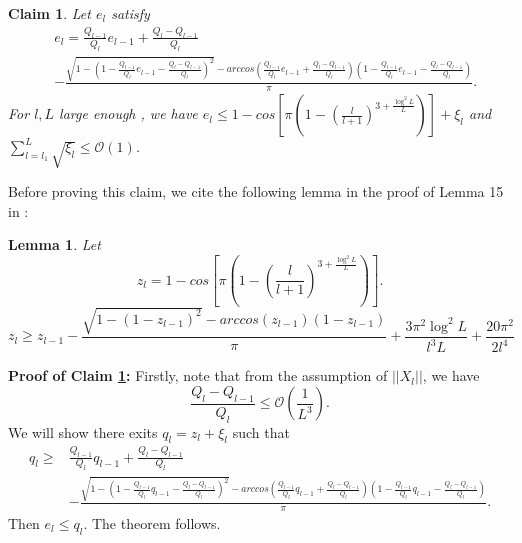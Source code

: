 \documentclass{article}
\newcommand{\cO}{\mathcal{O}}
\newtheorem{lem}[theo]{\textbf{Lemma}}
\newtheorem{cla}{\textbf{Claim}}[section]
\begin{document}
\begin{cla}\label{cl2}
Let $e_l$ satisfy
\begin{equation}
\begin{aligned}
&e_l=\frac{Q_{l-1}}{Q_{l}}e_{l-1}+\frac{Q_{l}-Q_{l-1}}{Q_{l}}\\
 &- \frac{\sqrt{1-(1-\frac{Q_{l-1}}{Q_{l}}e_{l-1}-\frac{Q_{l}-Q_{l-1}}{Q_{l}})^2}-arccos(\frac{Q_{l-1}}{Q_{l}}e_{l-1}+\frac{Q_{l}-Q_{l-1}}{Q_{l}})(1-\frac{Q_{l-1}}{Q_{l}}e_{l-1}-\frac{Q_{l}-Q_{l-1}}{Q_{l}})}{\pi}.
\end{aligned}
\end{equation}
For $l,L$ large enough , we have $e_l\leq  1-cos[\pi(1-(\frac{l}{l+1})^{3+\frac{\log^2L}{L}})]+\xi_l$ and $\sum_{l=l_1}^L\sqrt{\xi_l}\leq \cO(1)$.
\end{cla}
Before proving this claim, we cite the following lemma in the proof of Lemma 15 in \cite{huang2020deep}:
\begin{lem}\label{lr}
Let
\begin{equation}
z_l= 1-cos[\pi(1-(\frac{l}{l+1})^{3+\frac{\log^2L}{L}})].
\end{equation}
\begin{equation}\label{er}
z_{l}\geq z_{l-1}- \frac{\sqrt{1-(1-z_{l-1})^2}-arccos(z_{l-1})(1-z_{l-1})}{\pi}+\frac{3\pi^2\log^2L}{l^3L}+\frac{20\pi^2}{2l^4}
\end{equation}
\end{lem}
{\bf Proof of Claim \ref{cl2}:}
Firstly, note that from the assumption of $||X_l||$, we have
$$\frac{Q_{l}-Q_{l-1}}{Q_{l}}\leq \cO(\frac{1}{L^3}).$$
We will show there exits $q_l=z_l+\xi_l$ such that
\begin{equation}\label{fg}
\begin{aligned}
q_l\geq &\frac{Q_{l-1}}{Q_{l}}q_{l-1}+\frac{Q_{l}-Q_{l-1}}{Q_{l}}\\ &-\frac{\sqrt{1-(1-\frac{Q_{l-1}}{Q_{l}}q_{l-1}-\frac{Q_{l}-Q_{l-1}}{Q_{l}})^2}-arccos(\frac{Q_{l-1}}{Q_{l}}q_{l-1}+\frac{Q_{l}-Q_{l-1}}{Q_{l}})(1-\frac{Q_{l-1}}{Q_{l}}q_{l-1}-\frac{Q_{l}-Q_{l-1}}{Q_{l}})}{\pi}.
\end{aligned}
\end{equation}
Then $e_l\leq q_l$. The theorem follows.
\end{document}
